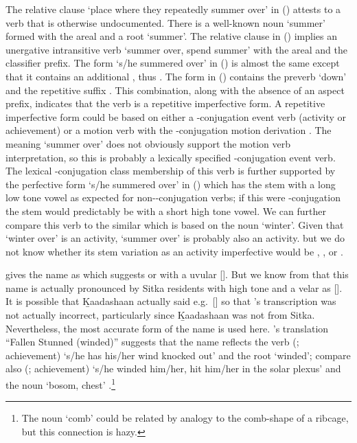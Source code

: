 The relative clause  ‘place where they repeatedly summer over’ in (\lastx) attests to a verb that is otherwise undocumented.
There is a well-known noun  ‘summer’ formed with the areal  and a root  ‘summer’.
The relative clause in (\lastx) implies an unergative intransitive verb  ‘summer over, spend summer’ with the areal  and the  classifier prefix.
The form  ‘s/he summered over’ in (\nextx) is almost the same except that it contains an additional , thus .
The form  in (\lastx) contains the preverb  ‘down’ and the repetitive suffix .
This combination, along with the absence of an aspect prefix, indicates that the verb is a repetitive imperfective form.
A  repetitive imperfective form could be based on either a -conjugation event verb (activity or achievement) or a motion verb with the -conjugation motion derivation .
The meaning ‘summer over’ does not obviously support the motion verb interpretation, so this is probably a lexically specified -conjugation event verb.
The lexical -conjugation class membership of this verb is further supported by the perfective form  ‘s/he summered over’ in (\nextx) which has the  stem  with a long low tone vowel as expected for non--conjugation verbs; if this were -conjugation the stem would predictably be  with a short high tone vowel.
We can further compare this verb to the similar  which is based on the noun  ‘winter’.
Given that ‘winter over’ is an activity, ‘summer over’ is probably also an activity. but we do not know whether its stem variation as an activity imperfective would be , , or .

\citeauthor{swanton:1911} gives the name  as  which suggests  or  with a uvular  [].
But we know from \textcite[97 \#295]{thornton:2012} that this name is actually pronounced by Sitka residents with high tone and a velar  as  [].
It is possible that Ḵaadashaan actually said e.g.\ [] so that \citeauthor{swanton:1911}’s transcription was not actually incorrect, particularly since Ḵaadashaan was not from Sitka.
Nevertheless, the most accurate form of the name is used here.
\citeauthor{thornton:2012}’s translation “Fallen Stunned (winded)” suggests that the name  reflects the verb  (; achievement) ‘s/he has his/her wind knocked out’ and the root  ‘winded’; compare also  (; achievement) ‘s/he winded him/her, hit him/her in the solar plexus’ and the noun  ‘bosom, chest’ \parencites[f03/44–46]{leer:1973}[617]{leer:1976}.\footnote{The noun  ‘comb’ could be related by analogy to the comb-shape of a ribcage, but this connection is hazy.}

